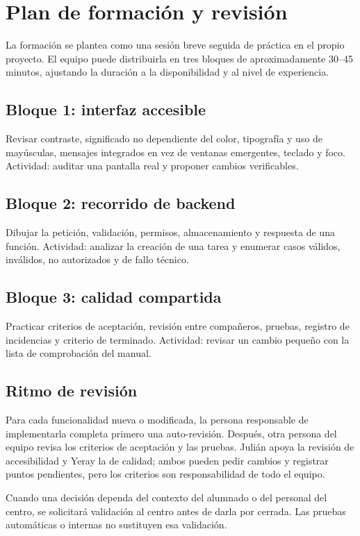 \section{Plan de formación y revisión}

La formación se plantea como una sesión breve seguida de práctica en el propio proyecto. El equipo puede distribuirla en tres bloques de aproximadamente 30--45 minutos, ajustando la duración a la disponibilidad y al nivel de experiencia.

\subsection{Bloque 1: interfaz accesible}
Revisar contraste, significado no dependiente del color, tipografía y uso de mayúsculas, mensajes integrados en vez de ventanas emergentes, teclado y foco. Actividad: auditar una pantalla real y proponer cambios verificables.

\subsection{Bloque 2: recorrido de backend}
Dibujar la petición, validación, permisos, almacenamiento y respuesta de una función. Actividad: analizar la creación de una tarea y enumerar casos válidos, inválidos, no autorizados y de fallo técnico.

\subsection{Bloque 3: calidad compartida}
Practicar criterios de aceptación, revisión entre compañeros, pruebas, registro de incidencias y criterio de terminado. Actividad: revisar un cambio pequeño con la lista de comprobación del manual.

\subsection{Ritmo de revisión}
Para cada funcionalidad nueva o modificada, la persona responsable de implementarla completa primero una auto-revisión. Después, otra persona del equipo revisa los criterios de aceptación y las pruebas. Julián apoya la revisión de accesibilidad y Yeray la de calidad; ambos pueden pedir cambios y registrar puntos pendientes, pero los criterios son responsabilidad de todo el equipo.

Cuando una decisión dependa del contexto del alumnado o del personal del centro, se solicitará validación al centro antes de darla por cerrada. Las pruebas automáticas o internas no sustituyen esa validación.